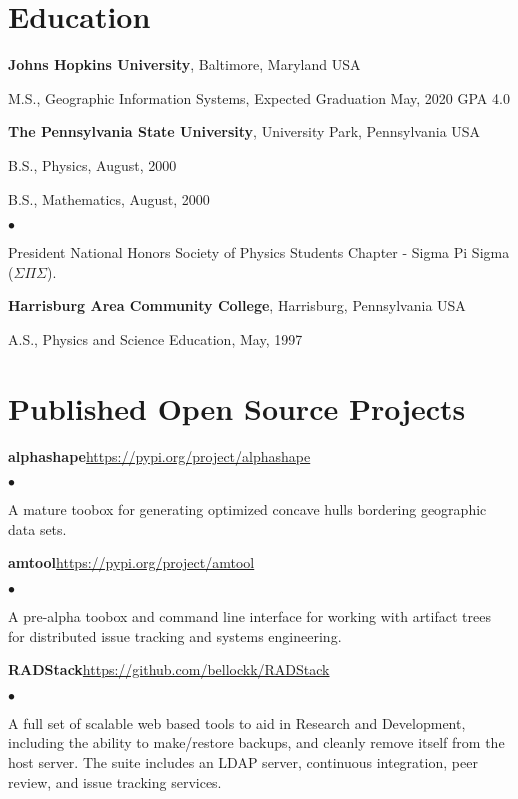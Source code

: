 \documentclass[margin,line]{res}
\newenvironment{list1}{
  \begin{list}{\ding{113}}{%
      \setlength{\itemsep}{0in}
      \setlength{\parsep}{0in} \setlength{\parskip}{0in}
      \setlength{\topsep}{0in} \setlength{\partopsep}{0in} 
      \setlength{\leftmargin}{0.17in}}}{\end{list}}
\newenvironment{list2}{%
  \begin{list}{$\bullet$}{%
      \setlength{\itemsep}{0in}
      \setlength{\parsep}{0in} \setlength{\parskip}{0in}
      \setlength{\topsep}{0in} \setlength{\partopsep}{0in} 
  \setlength{\leftmargin}{0.2in}}}{\end{list}}
\newcommand{\organization}[2] {{\bf #1}, #2\par}
\begin{document}
\begin{resume}
\section{\sc Education}

\organization{Johns Hopkins University}{Baltimore, Maryland USA}
\begin{list1}
  \item[] M.S., Geographic Information Systems, Expected Graduation May, 2020 \hfill GPA 4.0
\end{list1}

\organization{The Pennsylvania State University}{University Park, Pennsylvania USA}
\begin{list1}
  \item[] B.S., Physics, August, 2000
  \item[] B.S., Mathematics, August, 2000
  \begin{list2}\vspace*{.05in}
\item President National Honors Society of Physics Students Chapter - Sigma Pi Sigma ($\Sigma\Pi\Sigma$).
  \end{list2}\vspace*{.05in}
\end{list1}

\organization{Harrisburg Area Community College}{Harrisburg, Pennsylvania USA}
\begin{list1}
  \item[] A.S., Physics and Science Education,  May, 1997
\end{list1}

\section{\sc Published Open Source Projects}
{\bf alphashape}\hfill\url{https://pypi.org/project/alphashape}

\begin{list2}
\item A mature toobox for generating optimized concave hulls bordering geographic data sets.
\end{list2}

{\bf amtool}\hfill\url{https://pypi.org/project/amtool}

\begin{list2}
	\item A pre-alpha toobox and command line interface for working with artifact trees for distributed issue tracking and systems engineering.
\end{list2}

{\bf RADStack}\hfill\url{https://github.com/bellockk/RADStack}

\begin{list2}
	\item A full set of scalable web based tools to aid in Research and Development, including the ability to make/restore backups, and cleanly remove itself from the host server. The suite includes an LDAP server, continuous integration, peer review, and issue tracking services.
\end{list2}


\end{resume}
\end{document}
